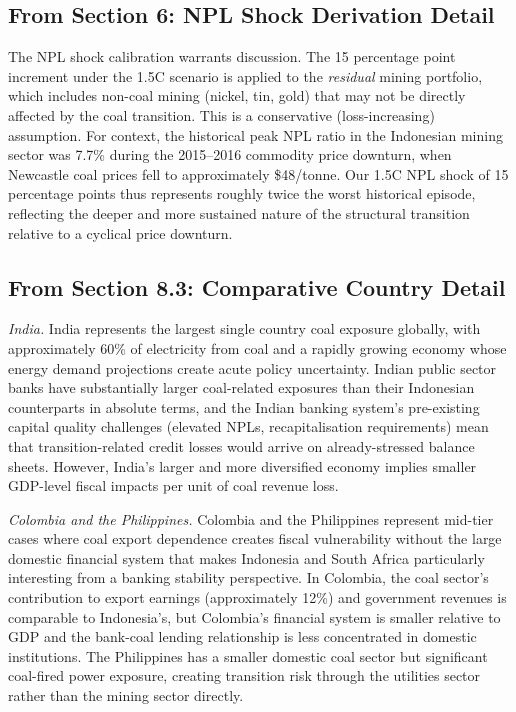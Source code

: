 \subsection*{From Section 6: NPL Shock Derivation Detail}

The NPL shock calibration warrants discussion. The 15 percentage point increment under the 1.5\textdegree C scenario is applied to the \textit{residual} mining portfolio, which includes non-coal mining (nickel, tin, gold) that may not be directly affected by the coal transition. This is a conservative (loss-increasing) assumption. For context, the historical peak NPL ratio in the Indonesian mining sector was 7.7\% during the 2015--2016 commodity price downturn, when Newcastle coal prices fell to approximately \$48/tonne. Our 1.5\textdegree C NPL shock of 15 percentage points thus represents roughly twice the worst historical episode, reflecting the deeper and more sustained nature of the structural transition relative to a cyclical price downturn.

\subsection*{From Section 8.3: Comparative Country Detail}

\textit{India.} India represents the largest single country coal exposure globally, with approximately 60\% of electricity from coal and a rapidly growing economy whose energy demand projections create acute policy uncertainty. Indian public sector banks have substantially larger coal-related exposures than their Indonesian counterparts in absolute terms, and the Indian banking system's pre-existing capital quality challenges (elevated NPLs, recapitalisation requirements) mean that transition-related credit losses would arrive on already-stressed balance sheets. However, India's larger and more diversified economy implies smaller GDP-level fiscal impacts per unit of coal revenue loss.

\textit{Colombia and the Philippines.} Colombia and the Philippines represent mid-tier cases where coal export dependence creates fiscal vulnerability without the large domestic financial system that makes Indonesia and South Africa particularly interesting from a banking stability perspective. In Colombia, the coal sector's contribution to export earnings (approximately 12\%) and government revenues is comparable to Indonesia's, but Colombia's financial system is smaller relative to GDP and the bank-coal lending relationship is less concentrated in domestic institutions. The Philippines has a smaller domestic coal sector but significant coal-fired power exposure, creating transition risk through the utilities sector rather than the mining sector directly.
